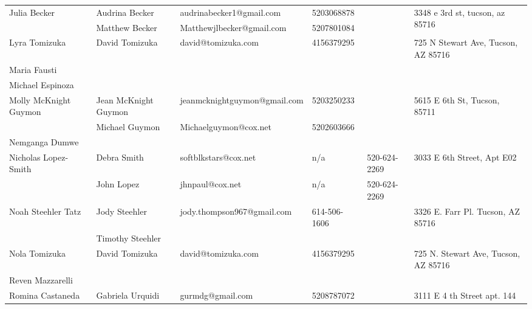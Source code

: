 \documentclass[landscape]{article}\usepackage[]{graphicx}\usepackage[]{color}
\begin{document}
\begin{longtable}{|p{100pt}|p{100pt}|p{140pt}|p{60pt}|p{64pt}|p{120pt}|}
\hline
\multirow{2}{100pt}{Julia Becker} & Audrina Becker & audrinabecker1@gmail.com & 5203068878 &  & \multirow{2}{120pt}{3348 e 3rd st, tucson, az 85716} \\
 & Matthew Becker & Matthewjlbecker@gmail.com & 5207801084 &  & \\
\hline
\multirow{2}{100pt}{Lyra Tomizuka} & David Tomizuka & david@tomizuka.com & 4156379295 &  & \multirow{2}{120pt}{725 N Stewart Ave, Tucson, AZ 85716} \\
 &  &  &  &  & \\
\hline
\multirow{2}{100pt}{Maria Fausti} &  &  &  &  & \multirow{2}{120pt}{} \\
 &  &  &  &  & \\
\hline
\multirow{2}{100pt}{Michael Espinoza} &  &  &  &  & \multirow{2}{120pt}{} \\
 &  &  &  &  & \\
\hline
\multirow{2}{100pt}{Molly McKnight Guymon} & Jean McKnight Guymon  & jeanmcknightguymon@gmail.com & 5203250233 &  & \multirow{2}{120pt}{5615 E 6th St, Tucson, 85711} \\
 & Michael Guymon  & Michaelguymon@cox.net & 5202603666 &  & \\
\hline
\multirow{2}{100pt}{Nemganga Dumwe} &  &  &  &  & \multirow{2}{120pt}{} \\
 &  &  &  &  & \\
\hline
\multirow{2}{100pt}{Nicholas Lopez-Smith} & Debra Smith & softblkstars@cox.net & n/a & 520-624-2269 & \multirow{2}{120pt}{3033 E 6th Street, Apt E02} \\
 & John Lopez & jhnpaul@cox.net & n/a & 520-624-2269 & \\
\hline
\multirow{2}{100pt}{Noah Steehler Tatz} & Jody Steehler & jody.thompson967@gmail.com & 614-506-1606 &  & \multirow{2}{120pt}{3326 E. Farr Pl. Tucson, AZ 85716} \\
 & Timothy Steehler &  &  &  & \\
\hline
\multirow{2}{100pt}{Nola Tomizuka} & David Tomizuka & david@tomizuka.com & 4156379295 &  & \multirow{2}{120pt}{725 N. Stewart Ave, Tucson, AZ 85716} \\
 &  &  &  &  & \\
\hline
\multirow{2}{100pt}{Reven Mazzarelli} &  &  &  &  & \multirow{2}{120pt}{} \\
 &  &  &  &  & \\
\hline
\multirow{2}{100pt}{Romina Castaneda} & Gabriela Urquidi & gurmdg@gmail.com & 5208787072 &  & \multirow{2}{120pt}{3111 E 4 th Street apt. 144} \\

\end{longtable}
\end{document}
